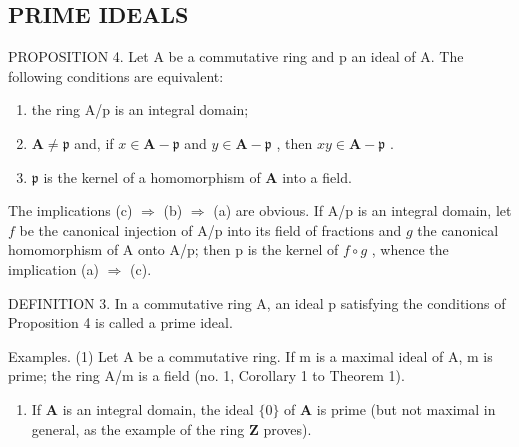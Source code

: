 \subsection{PRIME IDEALS}

PROPOSITION 4. Let A be a commutative ring and p an ideal of A. The following conditions are equivalent:

\begin{enumerate}
\def\labelenumi{(\alph{enumi})}
\item
  the ring A/p is an integral domain;
\item
  \(\mathbf{A} \neq \mathfrak{p}\) and, if \(x \in \mathbf{A} - \mathfrak{p}\) and \(y \in \mathbf{A} - \mathfrak{p}\) , then \(xy \in \mathbf{A} - \mathfrak{p}\) .
\item
  \(\mathfrak{p}\) is the kernel of a homomorphism of \(\mathbf{A}\) into a field.
\end{enumerate}

The implications (c) \(\Rightarrow\) (b) \(\Rightarrow\) (a) are obvious. If A/p is an integral domain, let \(f\) be the canonical injection of A/p into its field of fractions and \(g\) the canonical homomorphism of A onto A/p; then p is the kernel of \(f \circ g\) , whence the implication (a) \(\Rightarrow\) (c).

DEFINITION 3. In a commutative ring A, an ideal p satisfying the conditions of Proposition 4 is called a prime ideal.

Examples. (1) Let A be a commutative ring. If m is a maximal ideal of A, m is prime; the ring A/m is a field (no. 1, Corollary 1 to Theorem 1).

\begin{enumerate}
\def\labelenumi{(\arabic{enumi})}
\setcounter{enumi}{1}
\tightlist
\item
  If \(\mathbf{A}\) is an integral domain, the ideal \(\{0\}\) of \(\mathbf{A}\) is prime (but not maximal in general, as the example of the ring \(\mathbf{Z}\) proves).
\end{enumerate}

